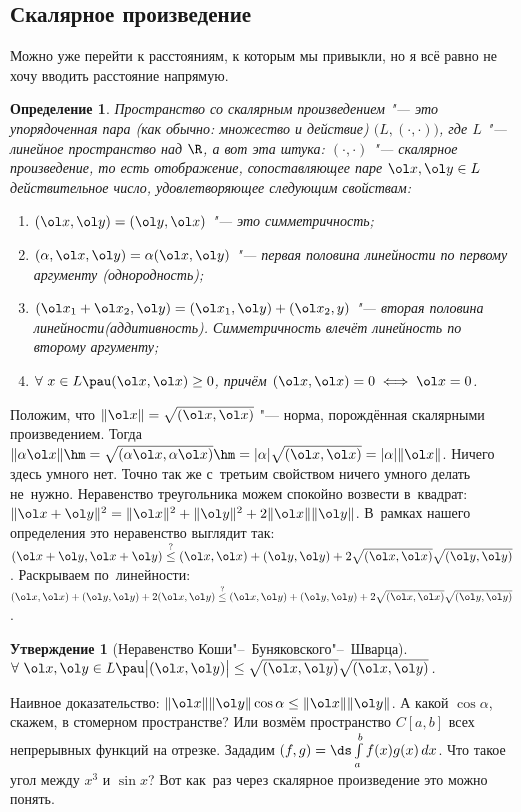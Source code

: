 \documentclass[a4paper,10pt,twoside]{article}
\newtheorem{Def}{Определение}[section]
\newtheorem{Ut}{Утверждение}[section]
\begin{document}
	 \subsection{Скалярное произведение}
	 Можно уже перейти к расстояниям, к которым мы привыкли, но я всё равно не хочу вводить расстояние напрямую.
	 \begin{Def}
	 Пространство со скалярным произведением "--- это упорядоченная пара (как обычно: множество и действие) $\big(L,(\cdot,\cdot)\big)$, где
	 $L$ "--- линейное пространство над $\R$, а вот эта штука: $(\cdot,\cdot)$ "--- скалярное произведение, то есть 
	 отображение, сопоставляющее паре $\ol x,\ol y\in L$ действительное число, удовлетворяющее следующим свойствам:
	 \begin{enumerate}
	   \item $(\ol x,\ol y) = (\ol y,\ol x)$ "--- это симметричность;
	   \item $(\alpha,\ol x,\ol y) = \alpha (\ol x,\ol y)$ "--- первая половина линейности по первому аргументу (однородность);
	   \item $(\ol x_1 + \ol x_2,\ol y) = (\ol x_1,\ol y)+(\ol x_2,y)$ "--- вторая половина линейности(аддитивность). Симметричность влечёт линейность по второму аргументу;
	   \item $\forall\ x\in L\pau (\ol x,\ol x)\geq0$, причём $(\ol x,\ol x)=0\iff\ol x=0$.
	 \end{enumerate}
	 \end{Def}
	 
	 Положим, что $\|\ol x\| = \sqrt{(\ol x,\ol x)}$ "--- норма, порождённая скалярными произведением. Тогда
	 $\|\alpha\ol x\| \hm= \sqrt{(\alpha\ol x,\alpha\ol x)}\hm=|\alpha|\sqrt{(\ol x,\ol x)} = |\alpha|\|\ol x\|$.
	 Ничего здесь умного нет. Точно так же с~третьим свойством ничего умного делать не~нужно. Неравенство треугольника
	 можем спокойно возвести в~квадрат: $\|\ol x+\ol y\|^2 = \|\ol x\|^2 + \|\ol y\|^2+2\|\ol x\|\|\ol y\|$.
	 В~рамках нашего определения это неравенство выглядит так: $(\ol x + \ol y,\ol x+\ol y)\overset{?}{\leq}
	 (\ol x,\ol x) + (\ol y,\ol y) + 2\sqrt{(\ol x,\ol x)}\sqrt{(\ol y,\ol y)}$. Раскрываем по~линейности:
	 $(\ol x,\ol x) + (\ol y,\ol y) + 2(\ol x,\ol y)\overset{?}{\leq} (\ol x,\ol y) + (\ol y,\ol y) + 2\sqrt{(\ol x,\ol x)}\sqrt{(\ol y,\ol y)}$.
	 
	 \begin{Ut}[Неравенство Коши"--~Буняковского"--~Шварца]\label{K-B-SH}
	 $\forall\ \ol x,\ol y\in L\pau \big|(\ol x,\ol y)\big|\leq\sqrt{(\ol x,\ol y)}\sqrt{(\ol x,\ol y)}$.
	 \end{Ut} 
	 Наивное доказательство: $\|\ol x\|\|\ol y\|\cos\alpha\leq\|\ol x\|\|\ol y\|$. А какой $\cos \alpha$, скажем, в стомерном пространстве?
	 Или возмём пространство $C[a,b]$ всех непрерывных функций на отрезке. Зададим $(f,g) = \ds\int\limits_a^bf(x)g(x)\,dx$. 
	 Что такое угол между $x^3$ и $\sin x$? Вот как~раз через скалярное произведение это можно понять.
	 
\end{document}

